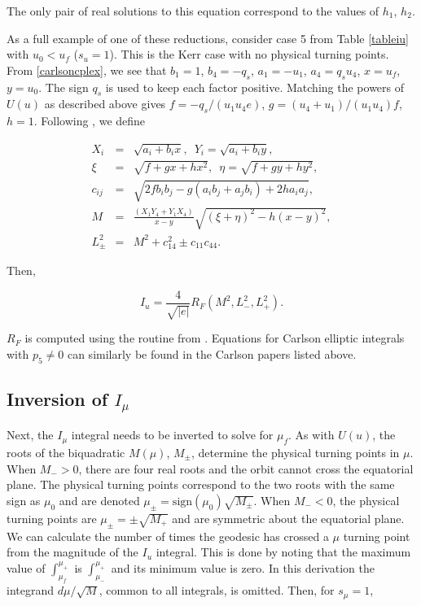 \documentclass[apj]{emulateapj}
\begin{document}
\noindent The only pair of real solutions to this equation correspond to the values of $h_1$, $h_2$.

As a full example of one of these reductions, consider case 5 from Table \ref{tableiu} with $u_0 < u_f$ ($s_u=1$). This is the Kerr case with no physical turning points. From \ref{carlsoncplex}, we see that $b_1=1$, $b_4=-q_s$, $a_1=-u_1$, $a_4=q_s u_4$, $x=u_f$, $y=u_0$. The sign $q_s$ is used to keep each factor positive. Matching the powers of $U(u)$ as described above gives $f=-q_s/(u_1 u_4 e)$, $g=(u_4+u_1)/(u_1 u_4) f$, $h=1$. Following \citet{carlson91}, we define

\begin{eqnarray}
 X_i &=& \sqrt{a_i+b_i x}, \hspace{6pt} Y_i = \sqrt{a_i+b_i y}, \\
 \xi &=& \sqrt{f+g x+h x^2}, \hspace{6pt} \eta=\sqrt{f+g y+h y^2}, \\
 c_{ij} &=&\sqrt{2 f b_i b_j-g(a_i b_j+a_j b_i) + 2 h a_i a_j}, \\
 M &=& \frac{(X_1 Y_4 + Y_1 X_4)}{x-y} \sqrt{(\xi+\eta)^2-h(x-y)^2}, \\
 L_{\pm}^2 &=& M^2+c_{14}^2 \pm c_{11} c_{44}.
\end{eqnarray}

Then, 

\begin{equation}
 I_u = \frac{4}{\sqrt{\vert e \vert}} R_F (M^2,L_-^2,L_+^2).
\end{equation}


\noindent $R_F$ is computed using the routine from \citet{numrecipes}. Equations for Carlson elliptic integrals with $p_5 \ne 0$ can similarly be found in the Carlson papers listed above.

\subsection{Inversion of $I_\mu$}

Next, the $I_\mu$ integral needs to be inverted to solve for $\mu_f$. As with $U(u)$, the roots of the biquadratic $M(\mu)$, $M_\pm$, determine the physical turning points in $\mu$. When $M_- > 0$, there are four real roots and the orbit cannot cross the equatorial plane. The physical turning points correspond to the two roots with the same sign as $\mu_0$ and are denoted $\mu_\pm = \mathrm{sign}(\mu_0) \sqrt{M_\pm}$. When $M_- < 0$, the physical turning points are $\mu_\pm = \pm \sqrt{M_+}$ and are symmetric about the equatorial plane. We can calculate the number of times the geodesic has crossed a $\mu$ turning point from the magnitude of the $I_u$ integral. This is done by noting that the maximum value of $\int_{\mu_f}^{\mu_+}$ is $\int_{\mu_-}^{\mu_+}$ and its minimum value is zero. In this derivation the integrand $d\mu/\sqrt{M}$, common to all integrals, is omitted. Then, for $s_\mu=1$,
\end{document}

